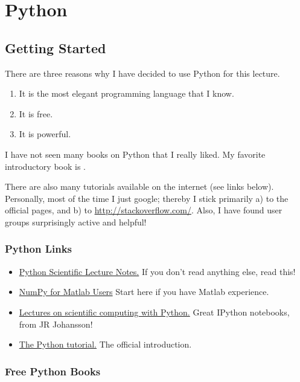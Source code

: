 \chapter{Python}

\section{Getting Started}

There are three reasons why I have decided to use Python for this lecture.

\begin{enumerate}
  \item It is the most elegant programming language that I know.
  \item It is free.
  \item It is powerful.
\end{enumerate}

I have not seen many books on Python that I really liked. My favorite introductory book is \cite{Harms2010}.

There are also many tutorials available on the internet (see links below). Personally, most of the time I just google; thereby I stick primarily a) to the official pages, and b) to \url{http://stackoverflow.com/}. Also, I have found user groups surprisingly active and helpful!

\subsection{Python Links}

\begin{itemize}
  \item  \href{http://scipy-lectures.github.com}{Python Scientific Lecture Notes.} If you don't read anything else, read this!
  \item \href{http://www.scipy.org/NumPy\_for\_Matlab\_Users}{NumPy for Matlab Users} Start here if you have Matlab experience.
  \item \href{https://github.com/jrjohansson/scientific-python-lectures}{Lectures on scientific computing with Python.} Great IPython notebooks, from JR Johansson!
  \item \href{http://docs.python.org/2/tutorial}{The Python tutorial.} The official introduction.
\end{itemize}

\subsection{Free Python Books}

